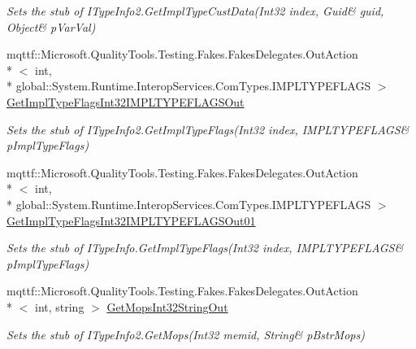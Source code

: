 \begin{DoxyCompactItemize}
\begin{DoxyCompactList}\small\item\em Sets the stub of I\-Type\-Info2.\-Get\-Impl\-Type\-Cust\-Data(Int32 index, Guid\& guid, Object\& p\-Var\-Val)\end{DoxyCompactList}\item 
mqttf\-::\-Microsoft.\-Quality\-Tools.\-Testing.\-Fakes.\-Fakes\-Delegates.\-Out\-Action\\*
$<$ int, \\*
global\-::\-System.\-Runtime.\-Interop\-Services.\-Com\-Types.\-I\-M\-P\-L\-T\-Y\-P\-E\-F\-L\-A\-G\-S $>$ \hyperlink{class_system_1_1_runtime_1_1_interop_services_1_1_com_types_1_1_fakes_1_1_stub_i_type_info2_a37a2dfa749f019186642a36765fea568}{Get\-Impl\-Type\-Flags\-Int32\-I\-M\-P\-L\-T\-Y\-P\-E\-F\-L\-A\-G\-S\-Out}
\begin{DoxyCompactList}\small\item\em Sets the stub of I\-Type\-Info2.\-Get\-Impl\-Type\-Flags(Int32 index, I\-M\-P\-L\-T\-Y\-P\-E\-F\-L\-A\-G\-S\& p\-Impl\-Type\-Flags)\end{DoxyCompactList}\item 
mqttf\-::\-Microsoft.\-Quality\-Tools.\-Testing.\-Fakes.\-Fakes\-Delegates.\-Out\-Action\\*
$<$ int, \\*
global\-::\-System.\-Runtime.\-Interop\-Services.\-Com\-Types.\-I\-M\-P\-L\-T\-Y\-P\-E\-F\-L\-A\-G\-S $>$ \hyperlink{class_system_1_1_runtime_1_1_interop_services_1_1_com_types_1_1_fakes_1_1_stub_i_type_info2_ad41f158c01e3c756e93a407e8695ecf1}{Get\-Impl\-Type\-Flags\-Int32\-I\-M\-P\-L\-T\-Y\-P\-E\-F\-L\-A\-G\-S\-Out01}
\begin{DoxyCompactList}\small\item\em Sets the stub of I\-Type\-Info.\-Get\-Impl\-Type\-Flags(Int32 index, I\-M\-P\-L\-T\-Y\-P\-E\-F\-L\-A\-G\-S\& p\-Impl\-Type\-Flags)\end{DoxyCompactList}\item 
mqttf\-::\-Microsoft.\-Quality\-Tools.\-Testing.\-Fakes.\-Fakes\-Delegates.\-Out\-Action\\*
$<$ int, string $>$ \hyperlink{class_system_1_1_runtime_1_1_interop_services_1_1_com_types_1_1_fakes_1_1_stub_i_type_info2_a493a161f36c1be58201294ea8cd71f05}{Get\-Mops\-Int32\-String\-Out}
\begin{DoxyCompactList}\small\item\em Sets the stub of I\-Type\-Info2.\-Get\-Mops(Int32 memid, String\& p\-Bstr\-Mops)\end{DoxyCompactList}\item 

\end{DoxyCompactItemize}

